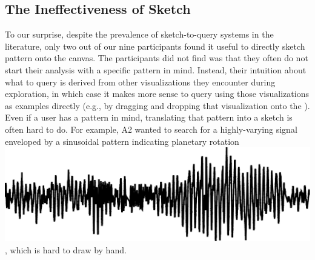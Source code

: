 \subsection{The Ineffectiveness of Sketch}
\par To our surprise,
despite the prevalence of sketch-to-query
systems in the literature,  only two out of our nine participants
found it useful to directly
sketch  pattern onto the canvas. %
The  participants
did not find  was that
they often do not start their analysis with a specific pattern in mind.
Instead, their intuition about what to query is derived
from other visualizations they encounter
during exploration, in which case it makes
more sense to query using those visualizations
as examples directly (e.g., by dragging and dropping
that visualization onto the ).
Even if a user has a pattern in mind,
translating that pattern into a sketch is often hard
to do. For example,
A2 wanted to search for a highly-varying signal
enveloped by a sinusoidal pattern indicating
planetary rotation \includegraphics[width=2\baselineskip,keepaspectratio]{figures/impossible_sketch.png}, which is hard to draw by hand.

